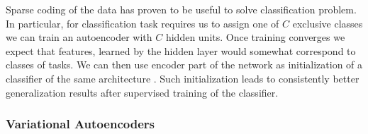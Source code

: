 Sparse coding of the data has proven to be useful to solve classification problem.
In particular, for classification task requires us to assign one of $C$ exclusive classes we can train an autoencoder with $C$ hidden units. Once training converges we expect that features, learned by the hidden layer would somewhat correspond to classes of tasks. We can then use encoder part of the network as initialization of a classifier of the same architecture \cite{Masci2011}.
Such initialization leads to consistently better generalization results after supervised training of the classifier.

\subsubsection{Variational Autoencoders}\label{ch:vae}



